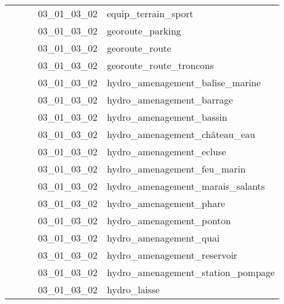 \documentclass[12pt,titlepage,oneside]{book}
\begin{document}
\begin{supertabular}{|p{7.5cm}|p{7.5cm}|p{7.5cm}|c|p{10cm}|}
                   &                    &                    & 03\_01\_03\_02 & equip\_terrain\_sport\\
                   &                    &                    & 03\_01\_03\_02 & georoute\_parking\\
                   &                    &                    & 03\_01\_03\_02 & georoute\_route\\
                   &                    &                    & 03\_01\_03\_02 & georoute\_route\_troncons\\
                   &                    &                    & 03\_01\_03\_02 & hydro\_amenagement\_balise\_marine\\
                   &                    &                    & 03\_01\_03\_02 & hydro\_amenagement\_barrage\\
                   &                    &                    & 03\_01\_03\_02 & hydro\_amenagement\_bassin\\
                   &                    &                    & 03\_01\_03\_02 & hydro\_amenagement\_château\_eau\\
                   &                    &                    & 03\_01\_03\_02 & hydro\_amenagement\_ecluse\\
                   &                    &                    & 03\_01\_03\_02 & hydro\_amenagement\_feu\_marin\\
                   &                    &                    & 03\_01\_03\_02 & hydro\_amenagement\_marais\_salants\\
                   &                    &                    & 03\_01\_03\_02 & hydro\_amenagement\_phare\\
                   &                    &                    & 03\_01\_03\_02 & hydro\_amenagement\_ponton\\
                   &                    &                    & 03\_01\_03\_02 & hydro\_amenagement\_quai\\
                   &                    &                    & 03\_01\_03\_02 & hydro\_amenagement\_reservoir\\
                   &                    &                    & 03\_01\_03\_02 & hydro\_amenagement\_station\_pompage\\
                   &                    &                    & 03\_01\_03\_02 & hydro\_laisse\\

\end{supertabular}
\end{document}
